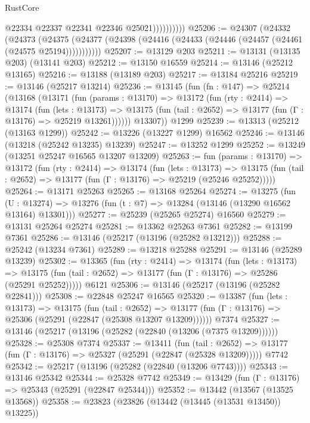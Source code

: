 \begin{lexlean}{RustCore}
\begin{coremodule}
                        @22334
                        @22337
                        @22341
                        @22346
                        @25021))))))))))
@25206 := @24307
    (@24332
      (@24373
        (@24375 (@24377 (@24398 (@24416 (@24433 (@24446 (@24457 (@24461 (@24575 @25194)))))))))))
@25207 := @13129 @203
@25211 := @13131 (@13135 @203) (@13141 @203)
@25212 := @13150 @16559
@25214 := @13146 (@25212 @13165)
@25216 := @13188 (@13189 @203)
@25217 := @13184 @25216
@25219 := @13146 (@25217 @13214)
@25236 := @13145
    (fun (fn : @147) =>
    @25214
      (@13168
        (@13171
          (fun (params : @13170) =>
          @13172
            (fun (rty : @2414) =>
            @13174
              (fun (lets : @13173) =>
              @13175 (fun (tail : @2652) => @13177 (fun (Γ : @13176) => @25219 @13261))))))
        @13307))
    @1299
@25239 := @13313 (@25212 (@13163 @1299))
@25242 := @13226 (@13227 @1299) @16562
@25246 := @13146 (@13218 (@25242 @13235) @13239)
@25247 := @13252 @1299
@25252 := @13249 (@13251 @25247 @16565 @13207 @13209)
@25263 := fun (params : @13170) =>
  @13172
    (fun (rty : @2414) =>
    @13174
      (fun (lets : @13173) =>
      @13175 (fun (tail : @2652) => @13177 (fun (Γ : @13176) => @25219 (@25246 @25252)))))
@25264 := @13171 @25263
@25265 := @13168 @25264
@25274 := @13275
    (fun (U : @13274) => @13276 (fun (t : @7) => @13284 (@13146 (@13290 @16562 @13164) @13301)))
@25277 := @25239 (@25265 @25274) @16560
@25279 := @13131 @25264 @25274
@25281 := @13362 @25263 @7361
@25282 := @13199 @7361
@25286 := @13146 (@25217 (@13196 (@25282 @13212)))
@25288 := @25242 (@13234 @7361)
@25289 := @13218 @25288
@25291 := @13146 (@25289 @13239)
@25302 := @13365
    (fun (rty : @2414) =>
    @13174
      (fun (lets : @13173) =>
      @13175 (fun (tail : @2652) => @13177 (fun (Γ : @13176) => @25286 (@25291 @25252)))))
    @6121
@25306 := @13146 (@25217 (@13196 (@25282 @22841)))
@25308 := @22848 @25247 @16565
@25320 := @13387
    (fun (lets : @13173) =>
    @13175
      (fun (tail : @2652) =>
      @13177 (fun (Γ : @13176) => @25306 (@25291 (@22847 (@25308 @13207 @13209))))))
    @7374
@25327 := @13146 (@25217 (@13196 (@25282 (@22840 (@13206 (@7375 @13209))))))
@25328 := @25308 @7374
@25337 := @13411
    (fun (tail : @2652) => @13177 (fun (Γ : @13176) => @25327 (@25291 (@22847 (@25328 @13209)))))
    @7742
@25342 := @25217 (@13196 (@25282 (@22840 (@13206 @7743))))
@25343 := @13146 @25342
@25344 := @25328 @7742
@25349 := @13429 (fun (Γ : @13176) => @25343 (@25291 (@22847 @25344)))
@25352 := @13442 (@13567 (@13525 @13568))
@25358 := @23823 (@23826 (@13442 (@13445 (@13531 @13450)) @13225))

\end{coremodule}
\end{lexlean}
